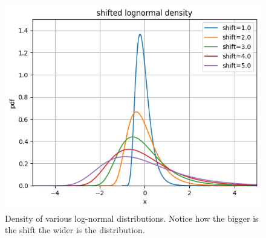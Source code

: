 \documentclass[12pt,a4paper]{book}
\begin{document}
\begin{figure}[htbp]
\begin{center}
	\includegraphics[width=0.6\linewidth]{addons/lognormal_shifted}
\end{center}
\caption{Density of various log-normal  distributions. Notice how the bigger is the shift the wider is the distribution.}
\label{fig:lognormal_shifted}
\end{figure}
\end{document}
